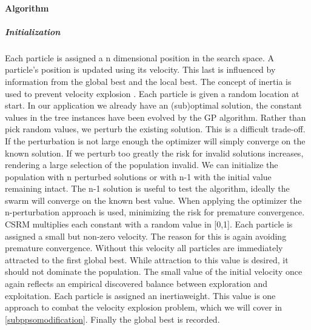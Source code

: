 \paragraph{Algorithm}
\subparagraph{Initialization}
Each particle is assigned a n dimensional position in the search space. A particle's position is updated using its velocity. This last is influenced by information from the global best and the local best. The concept of inertia is used to prevent velocity explosion \cite{PSOExplosion}.
Each particle is given a random location at start. In our application we already have an (sub)optimal solution, the constant values in the tree instances have been evolved by the GP algorithm. Rather than pick random values, we perturb the existing solution. This is a difficult trade-off. If the perturbation is not large enough the optimizer will simply converge on the known solution. If we perturb too greatly the risk for invalid solutions increases, rendering a large selection of the population invalid. We can initialize the population with n perturbed solutions or with n-1 with the initial value remaining intact. The n-1 solution is useful to test the algorithm, ideally the swarm will converge on the known best value. When applying the optimizer the n-perturbation approach is used, minimizing the risk for premature convergence.
CSRM multiplies each constant with a random value in [0,1].
Each particle is assigned a small but non-zero velocity. The reason for this is again avoiding premature convergence. Without this velocity all particles are immediately attracted to the first global best. While attraction to this value is desired, it should not dominate the population. The small value of the initial velocity once again reflects an empirical discovered balance between exploration and exploitation.
Each particle is assigned an inertiaweight.
This value is one approach to combat the velocity explosion problem, which we will cover in \ref{subppsomodification}. 
Finally the global best is recorded. 


